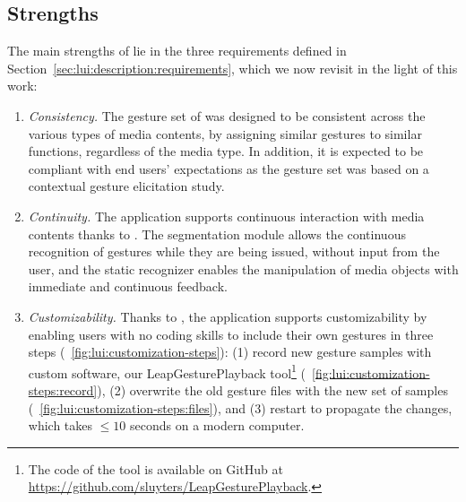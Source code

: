 \subsection{Strengths} \label{sec:lui:discussion:strengths}
The main strengths of \lui lie in the three requirements defined in Section~\ref{sec:lui:description:requirements}, which we now revisit in the light of this work:
%
\begin{enumerate}
    \item \textit{Consistency.} The gesture set of \lui was designed to be consistent across the various types of media contents, by assigning similar gestures to similar functions, regardless of the media type. In addition, it is expected to be compliant with end users' expectations as the gesture set was based on a contextual gesture elicitation study.
    \item \textit{Continuity.} The \lui application supports continuous interaction with media contents thanks to \ql. The segmentation module allows the continuous recognition of gestures while they are being issued, without input from the user, and the static recognizer enables the manipulation of media objects with immediate and continuous feedback.
    \item \textit{Customizability.} Thanks to \ql, the \lui application supports customizability by enabling users with no coding skills to include their own gestures in three steps (\fig~\ref{fig:lui:customization-steps}): (1) record new gesture samples with custom software, \eg our LeapGesturePlayback tool\footnote{The code of the tool is available on GitHub at \url{https://github.com/sluyters/LeapGesturePlayback}.} (\fig~\ref{fig:lui:customization-steps:record}), (2) overwrite the old gesture files with the new set of samples (\fig~\ref{fig:lui:customization-steps:files}), and (3) restart \ql to propagate the changes, which takes $\leq 10$ seconds on a modern computer.
\end{enumerate}

